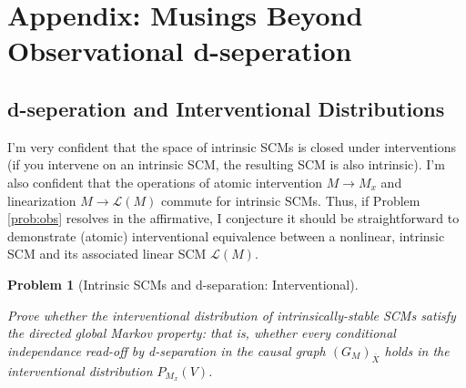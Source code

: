 \documentclass[letterpaper,10pt]{article}
\newtheorem{problem}{Problem}
\begin{document}








\section{Appendix: Musings Beyond Observational d-seperation}

\subsection{d-seperation and Interventional Distributions} \label{speculation}

I’m very confident that the space of intrinsic SCMs is closed under interventions (if you intervene on an intrinsic SCM, the resulting SCM is also intrinsic).
I’m also confident that the operations of atomic intervention $M\rightarrow M_x$ and linearization $M\rightarrow \mathcal{L}(M)$ commute for intrinsic SCMs.
Thus, if Problem \ref{prob:obs} resolves in the affirmative, I conjecture it should be straightforward to demonstrate (atomic) interventional equivalence between a nonlinear, intrinsic SCM and its associated linear SCM $\mathcal{L}(M)$.

\begin{problem}[Intrinsic SCMs and d-separation: Interventional]
\label{prob:int}

Prove whether the interventional distribution of intrinsically-stable SCMs satisfy the directed global Markov property: that is, whether every conditional independance read-off by d-separation in the causal graph $(G_M)_{\overline{X}}$ holds in the interventional distribution $P_{M_x}(V)$.
\end{problem}
\end{document}
